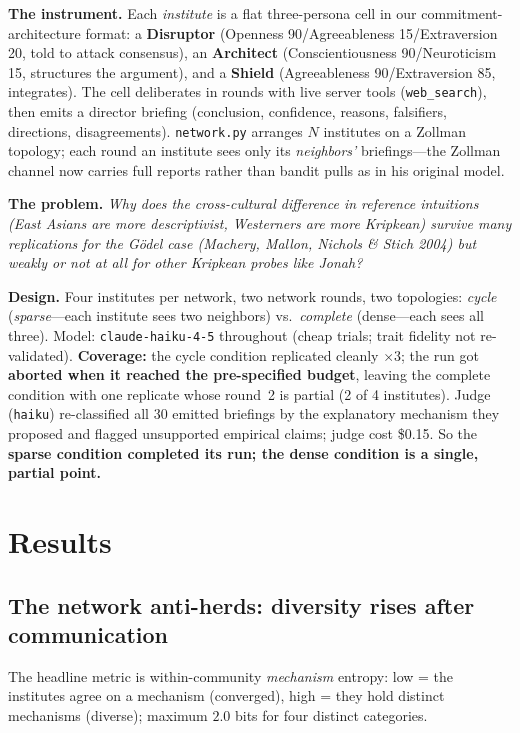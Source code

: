 \documentclass[11pt]{article}
\begin{document}
\textbf{The instrument.} Each \emph{institute} is a flat three-persona cell in our commitment-architecture format: a \textbf{Disruptor} (Openness 90/Agreeableness 15/Extraversion 20, told to attack consensus), an \textbf{Architect} (Conscientiousness 90/Neuroticism 15, structures the argument), and a \textbf{Shield} (Agreeableness 90/Extraversion 85, integrates). The cell deliberates in rounds with live server tools (\texttt{web\_search}), then emits a  director briefing (conclusion, confidence, reasons, falsifiers, directions, disagreements). \texttt{network.py} arranges $N$ institutes on a Zollman topology; each round an institute sees only its \emph{neighbors'} briefings---the Zollman channel now carries full reports rather than bandit pulls as in his original model. 

\textbf{The problem.} \emph{Why does the cross-cultural difference in reference intuitions (East Asians are more descriptivist, Westerners are more Kripkean) survive many replications for the G\"odel case (Machery, Mallon, Nichols \& Stich 2004) but weakly or not at all for other Kripkean probes like Jonah?}

\textbf{Design.} Four institutes per network, two network rounds, two topologies: \emph{cycle} (\emph{sparse}---each institute sees two neighbors) vs.\ \emph{complete} (dense---each sees all three). Model: \texttt{claude-haiku-4-5} throughout (cheap trials; trait fidelity not re-validated). \textbf{Coverage:} the cycle condition replicated cleanly $\times 3$; the run got \textbf{aborted when it reached the pre-specified budget}, leaving the complete condition with one replicate whose round~2 is partial (2 of 4 institutes). Judge (\texttt{haiku}) re-classified all 30 emitted briefings by the explanatory mechanism they proposed and flagged unsupported empirical claims; judge cost \$0.15. So the \textbf{sparse condition completed its run; the dense condition is a single, partial point.}

\section{Results}

\subsection{The network anti-herds: diversity rises after communication}

The headline metric is within-community \emph{mechanism} entropy: low = the institutes agree on a mechanism (converged), high = they hold distinct mechanisms (diverse); maximum $2.0$ bits for four distinct categories.
\end{document}

